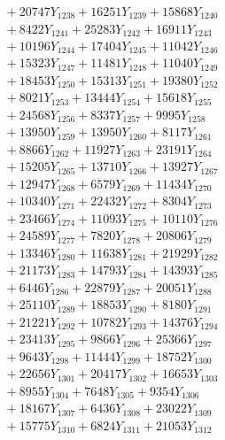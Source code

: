 \documentclass[a4paper,10pt]{article}
\begin{document}
{\begin{align}
&\;  + 20747 Y_{1238} + 16251 Y_{1239} + 15868 Y_{1240} \\[0.3ex]
&\;  + 8422 Y_{1241} + 25283 Y_{1242} + 16911 Y_{1243} \\[0.3ex]
&\;  + 10196 Y_{1244} + 17404 Y_{1245} + 11042 Y_{1246} \\[0.3ex]
&\;  + 15323 Y_{1247} + 11481 Y_{1248} + 11040 Y_{1249} \\[0.3ex]
&\;  + 18453 Y_{1250} + 15313 Y_{1251} + 19380 Y_{1252} \\[0.3ex]
&\;  + 8021 Y_{1253} + 13444 Y_{1254} + 15618 Y_{1255} \\[0.3ex]
&\;  + 24568 Y_{1256} + 8337 Y_{1257} + 9995 Y_{1258} \\[0.5ex]\allowbreak
&\;  + 13950 Y_{1259} + 13950 Y_{1260} + 8117 Y_{1261} \\[0.3ex]
&\;  + 8866 Y_{1262} + 11927 Y_{1263} + 23191 Y_{1264} \\[0.3ex]
&\;  + 15205 Y_{1265} + 13710 Y_{1266} + 13927 Y_{1267} \\[0.3ex]
&\;  + 12947 Y_{1268} + 6579 Y_{1269} + 11434 Y_{1270} \\[0.3ex]
&\;  + 10340 Y_{1271} + 22432 Y_{1272} + 8304 Y_{1273} \\[0.3ex]
&\;  + 23466 Y_{1274} + 11093 Y_{1275} + 10110 Y_{1276} \\[0.3ex]
&\;  + 24589 Y_{1277} + 7820 Y_{1278} + 20806 Y_{1279} \\[0.3ex]
&\;  + 13346 Y_{1280} + 11638 Y_{1281} + 21929 Y_{1282} \\[0.3ex]
&\;  + 21173 Y_{1283} + 14793 Y_{1284} + 14393 Y_{1285} \\[0.3ex]
&\;  + 6446 Y_{1286} + 22879 Y_{1287} + 20051 Y_{1288} \\[0.5ex]\allowbreak
&\;  + 25110 Y_{1289} + 18853 Y_{1290} + 8180 Y_{1291} \\[0.3ex]
&\;  + 21221 Y_{1292} + 10782 Y_{1293} + 14376 Y_{1294} \\[0.3ex]
&\;  + 23413 Y_{1295} + 9866 Y_{1296} + 25366 Y_{1297} \\[0.3ex]
&\;  + 9643 Y_{1298} + 11444 Y_{1299} + 18752 Y_{1300} \\[0.3ex]
&\;  + 22656 Y_{1301} + 20417 Y_{1302} + 16653 Y_{1303} \\[0.3ex]
&\;  + 8955 Y_{1304} + 7648 Y_{1305} + 9354 Y_{1306} \\[0.3ex]
&\;  + 18167 Y_{1307} + 6436 Y_{1308} + 23022 Y_{1309} \\[0.3ex]
&\;  + 15775 Y_{1310} + 6824 Y_{1311} + 21053 Y_{1312} \\[0.3ex]

\end{align}}
\end{document}
